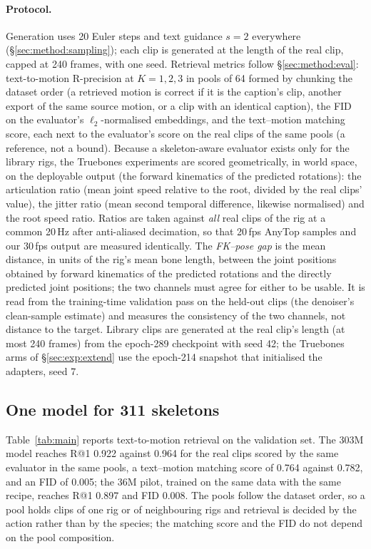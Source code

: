 \paragraph{Protocol.} Generation uses 20 Euler steps and text guidance $s{=}2$ everywhere
(\S\ref{sec:method:sampling}); each clip is generated at the length of the real clip, capped at
240 frames, with one seed. Retrieval metrics follow \S\ref{sec:method:eval}: text-to-motion
R-precision at $K{=}1,2,3$ in pools of 64 formed by chunking the dataset order (a retrieved motion
is correct if it is the caption's clip, another export of the same source motion, or a clip with an
identical caption), the FID on the evaluator's
$\ell_2$-normalised embeddings, and the text--motion matching score, each next to the evaluator's
score on the real clips of the same pools (a reference, not a bound). Because a skeleton-aware evaluator exists
only for the library rigs, the Truebones experiments are scored geometrically, in world space,
on the deployable output (the forward kinematics of the predicted rotations): the articulation ratio (mean joint speed relative to the root,
divided by the real clips' value), the jitter ratio (mean second temporal difference, likewise
normalised) and the root speed ratio. Ratios are taken against \emph{all} real clips of the
rig at a common 20\,Hz after anti-aliased decimation, so that 20\,fps AnyTop samples and our
30\,fps output are measured identically. The \emph{FK--pose gap} is the mean distance, in units
of the rig's mean bone length, between the joint positions obtained by forward kinematics of the
predicted rotations and the directly predicted joint positions; the two channels must agree for
either to be usable. It is read from the training-time validation pass on the held-out clips (the
denoiser's clean-sample estimate) and measures the consistency of the two channels, not distance to
the target. Library clips are generated at the real clip's length (at most 240 frames)
from the epoch-289 checkpoint with seed 42; the Truebones arms of \S\ref{sec:exp:extend} use the
epoch-214 snapshot that initialised the adapters, seed 7.

\subsection{One model for 311 skeletons}\label{sec:exp:main}

Table~\ref{tab:main} reports text-to-motion retrieval on the validation set. The \num{303}M
model reaches R@1 \num{0.922} against \num{0.964} for the real clips scored by the same evaluator
in the same pools, a text--motion matching score of \num{0.764} against \num{0.782}, and an FID of
\num{0.005}; the \num{36}M pilot, trained on the same data with the same recipe, reaches R@1
\num{0.897} and FID \num{0.008}. The pools follow the dataset order, so a pool holds clips of one
rig or of neighbouring rigs and retrieval is decided by the action rather than by the species;
the matching score and the FID do not depend on the pool composition.

